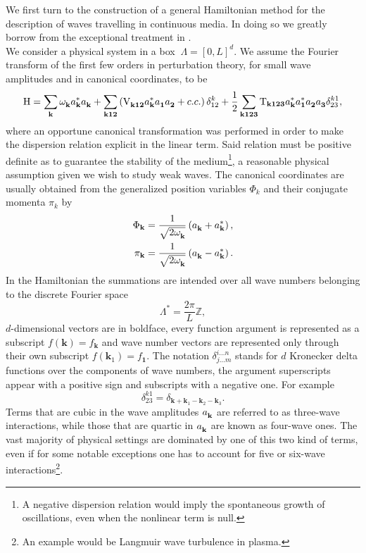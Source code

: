 We first turn to the construction of a general Hamiltonian method for the description of waves travelling in continuous media. In doing so
we greatly borrow from the exceptional treatment in \cite{Zakharov}. \\
We consider a physical system in a box $\ \Lambda = [0,L]^d$. We assume the Fourier transform of the first few orders in 
perturbation theory, for small wave amplitudes and in canonical coordinates, to be
\begin{equation}
    \mathrm{H} = \sum_\mathbf{k} \omega^{}_\mathbf{k} a_\mathbf{k}^{*} a_\mathbf{k}^{} + \sum_{\mathbf{k12}} \left( \mathrm{V}_{\mathbf{k12}}^{} a_\mathbf{k}^{*}a_\mathbf{1}^{}a_\mathbf{2}^{} + c.c.  \right)\delta^{k}_{12} \\
    +\frac{1}{2}\sum_{\mathbf{k123}} \mathrm{T}_{\mathbf{k123}} a_\mathbf{k}^{*}a_\mathbf{1}^{*}a_\mathbf{2}^{}a_\mathbf{3}^{}\delta^{k1}_{23},
    \label{HamOrig}
\end{equation}
where an opportune canonical transformation was performed in order to make the dispersion relation explicit in the linear term. Said relation must be positive definite 
as to guarantee the stability of the medium\footnote{A negative dispersion relation would imply the spontaneous growth of oscillations, even when the nonlinear
term is null.}, a reasonable physical assumption given we wish to study weak waves. The canonical coordinates are usually obtained from the generalized position
variables $\Phi_k$ and their conjugate momenta $\pi_k$ by
\begin{align*}
    \Phi_\mathbf{k} &= \frac{1}{\sqrt{2\omega^{}_{\mathbf{k}}}}\left(a_\mathbf{k}^{} + a_\mathbf{k}^{*}\right) , \\
    \pi_\mathbf{k} &= \frac{1}{\sqrt{2\omega^{}_{\mathbf{k}}}}\left(a_\mathbf{k}^{} - a_\mathbf{k}^{*} \right) .
\end{align*}
In the Hamiltonian the summations are intended over all wave numbers belonging to the discrete Fourier space 
\begin{equation}
    \Lambda^* = \frac{2\pi}{L}\mathbb{Z},
\end{equation}
$d$-dimensional vectors are in boldface, every function argument is represented as a subscript $f(\mathbf{k})=f_\mathbf{k}$ and wave number vectors are 
represented only through their own subscript $f(\mathbf{k}_1)=f_\mathbf{1}$. The notation $\delta^{i\dots n}_{j \dots m}$ stands for $d$ Kronecker delta functions over the components of 
wave numbers, 
the argument superscripts appear with a positive sign and subscripts with a negative one. For example 
\begin{equation}
    \delta^{k1}_{23} = \delta_{\mathbf{k} + \mathbf{k}_1 - 
    \mathbf{k}_2 - \mathbf{k}_3}.
\end{equation}
Terms that are cubic in the wave amplitudes $a_\mathbf{k}^{}$ are referred to as three-wave interactions, while those that are quartic in $a_\mathbf{k}^{}$ are known as four-wave ones. The vast majority of physical 
settings are dominated by one of this two kind of terms, even if for some notable exceptions one has to account for five or six-wave interactions\footnote{An example would be
Langmuir wave turbulence in plasma.}. \\


